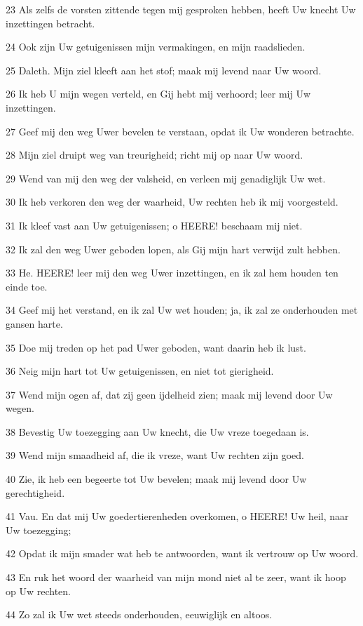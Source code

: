 \par 23 Als zelfs de vorsten zittende tegen mij gesproken hebben, heeft Uw knecht Uw inzettingen betracht.
\par 24 Ook zijn Uw getuigenissen mijn vermakingen, en mijn raadslieden.
\par 25 Daleth. Mijn ziel kleeft aan het stof; maak mij levend naar Uw woord.
\par 26 Ik heb U mijn wegen verteld, en Gij hebt mij verhoord; leer mij Uw inzettingen.
\par 27 Geef mij den weg Uwer bevelen te verstaan, opdat ik Uw wonderen betrachte.
\par 28 Mijn ziel druipt weg van treurigheid; richt mij op naar Uw woord.
\par 29 Wend van mij den weg der valsheid, en verleen mij genadiglijk Uw wet.
\par 30 Ik heb verkoren den weg der waarheid, Uw rechten heb ik mij voorgesteld.
\par 31 Ik kleef vast aan Uw getuigenissen; o HEERE! beschaam mij niet.
\par 32 Ik zal den weg Uwer geboden lopen, als Gij mijn hart verwijd zult hebben.
\par 33 He. HEERE! leer mij den weg Uwer inzettingen, en ik zal hem houden ten einde toe.
\par 34 Geef mij het verstand, en ik zal Uw wet houden; ja, ik zal ze onderhouden met gansen harte.
\par 35 Doe mij treden op het pad Uwer geboden, want daarin heb ik lust.
\par 36 Neig mijn hart tot Uw getuigenissen, en niet tot gierigheid.
\par 37 Wend mijn ogen af, dat zij geen ijdelheid zien; maak mij levend door Uw wegen.
\par 38 Bevestig Uw toezegging aan Uw knecht, die Uw vreze toegedaan is.
\par 39 Wend mijn smaadheid af, die ik vreze, want Uw rechten zijn goed.
\par 40 Zie, ik heb een begeerte tot Uw bevelen; maak mij levend door Uw gerechtigheid.
\par 41 Vau. En dat mij Uw goedertierenheden overkomen, o HEERE! Uw heil, naar Uw toezegging;
\par 42 Opdat ik mijn smader wat heb te antwoorden, want ik vertrouw op Uw woord.
\par 43 En ruk het woord der waarheid van mijn mond niet al te zeer, want ik hoop op Uw rechten.
\par 44 Zo zal ik Uw wet steeds onderhouden, eeuwiglijk en altoos.
